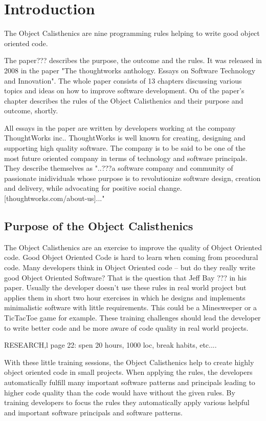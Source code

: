 \chapter{Introduction}
The Object Calisthenics are nine programming rules helping to write good object oriented code.

The paper??? describes the purpose, the outcome and the rules. It was released in 2008 in the paper "The thoughtworks anthology. Essays on Software Technology and Innovation". The whole paper consists of 13 chapters discussing various topics and ideas on how to improve software development. On of the paper's chapter describes the rules of the Object Calisthenics and their purpose and outcome, shortly.

All essays in the paper are written by developers working at the company ThoughtWorks inc.. ThoughtWorks is well known for creating, designing and supporting high quality software. The company is to be said to be one of the most future oriented company in terms of technology and software principals. They describe themselves as "..???a software company and community of passionate inidividuals whose purpose is to revolutionize software design, creation and delivery, while advocating for positive social change. [thoughtworks.com/about-us]..."

\section{Purpose of the Object Calisthenics}
The Object Calisthenics are an exercise to improve the quality of Object Oriented code. Good Object Oriented Code is hard to learn when coming from procedural code. Many developers think in Object Oriented code – but do they really write good Object Oriented Software? That is the question that Jeff Bay ??? in his paper. 
Usually the developer doesn’t use these rules in real world project but applies them in short two hour exercises in which he designs and implements minimalistic software with little requirements. This could be a Minesweeper or a TicTacToe game for example. These training challenges should lead the developer to write better code and be more aware of code quality in real world projects.

RESEARCH,l page 22: spen 20 hours, 1000 loc, break habits, etc....

With these little training sessions, the Object Calisthenics help to create highly object oriented code  in small projects. When applying the rules, the developers automatically fulfill many important software patterns and principals leading to higher code quality than the code would have without the given rules. By training developers to focus the rules they automatically apply various helpful and important software principals and software patterns. 

